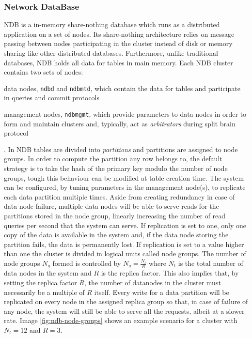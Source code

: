 \subsubsection{Network DataBase}
NDB is a in-memory share-nothing database which runs as a distributed application on a set of nodes.
Its share-nothing architecture relies on message passing between nodes participating in the cluster instead of disk or memory sharing like other distributed databases.
Furthermore, unlike traditional databases, NDB holds all data for tables in main memory.
Each NDB cluster contains two sets of nodes: \begin{inparaenum}[i)]
    \item data nodes, \texttt{ndbd} and \texttt{ndbmtd}, which contain the data for tables and participate in queries and commit protocols
    \item management nodes, \texttt{ndbmgmt}, which provide parameters to data nodes in order to form and maintain clusters and, typically, act as \emph{arbitrators} during split brain protocol 
\end{inparaenum}.
In NDB tables are divided into \emph{partitions} and partitions are assigned to node groups.
In order to compute the partition any row belongs to, the default strategy is to take the hash of the primary key modulo the number of node groups, tough this behaviour can be modified at table creation time.
The system can be configured, by tuning parameters in the management node(s), to replicate each data partition multiple times.
Aside from creating redundancy in case of data node failure, multiple data nodes will be able to serve reads for the partitions stored in the node group, linearly increasing the number of read queries per second that the system can serve.
If replication is set to one, only one copy of the data is available in the system and, if the data node storing the partition fails, the data is permanently lost.
If replication is set to a value higher than one the cluster is divided in logical units called node groups.
The number of node groups $N_g$ formed is controlled by $N_g = \frac{N_t}{R}$ where $N_t$ is the total number of data nodes in the system and $R$ is the replica factor.
This also implies that, by setting the replica factor $R$, the number of datanodes in the cluster must necessarily be a multiple of $R$ itself.
Every write for a data partition will be replicated on every node in the assigned replica group so that, in case of failure of any node, the system will still be able to serve all the requests, albeit at a slower rate.
Image \ref{fig:ndb-node-groups} shows an example scenario for a cluster with $N_t = 12$ and $R = 3$.

